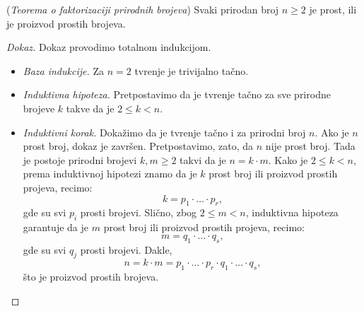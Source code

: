 \begin{EX}(\textit{Teorema o faktorizaciji prirodnih brojeva})
  Svaki prirodan broj $n \ge 2$ je prost, ili je proizvod prostih brojeva.
\end{EX}
\begin{proof}[Dokaz]
  Dokaz provodimo totalnom indukcijom.
  \begin{itemize}
  \item
    \emph{Baza indukcije.} Za $n = 2$ tvr\dj enje je trivijalno ta\v cno.
  
  \item
    \emph{Induktivna hipoteza.} Pretpostavimo da je tvr\dj enje ta\v cno za sve prirodne brojeve $k$ takve da je $2 \le k < n$.
  \item
    \emph{Induktivni korak.} Doka\v zimo da je tvr\dj enje ta\v cno i za prirodni broj $n$.
    Ako je $n$ prost broj, dokaz je zavr\v sen. Pretpostavimo, zato, da $n$ nije prost broj.
    Tada je postoje prirodni brojevi $k, m \ge 2$ takvi da je $n = k \cdot m$. Kako je $2 \le k < n$, prema induktivnoj hipotezi
    znamo da je $k$ prost broj ili proizvod prostih projeva, recimo:
    $$
      k = p_1 \cdot \ldots \cdot p_r,
    $$
    gde su svi $p_i$ prosti brojevi. Sli\v cno, zbog $2 \le m < n$, induktivna hipoteza garantuje da je $m$ prost broj ili proizvod prostih projeva, recimo:
    $$
      m = q_1 \cdot \ldots \cdot q_s,
    $$
    gde su svi $q_j$ prosti brojevi. Dakle,
    $$
      n = k \cdot m = p_1 \cdot \ldots \cdot p_r \cdot q_1 \cdot \ldots \cdot q_s,
    $$
    \v sto je proizvod prostih brojeva.
  \end{itemize}
\end{proof}


